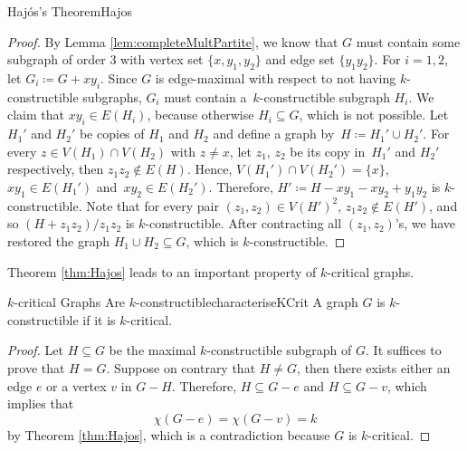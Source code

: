 \documentclass[math]{amznotes}
\theoremstyle{remark}
\begin{document}
\begin{thmbox}{Haj\'{o}s's Theorem}{Hajos}
\begin{proof}
        By Lemma \ref{lem:completeMultPartite}, we know that $G$ must contain some subgraph of order $3$ with vertex set $\{x, y_1, y_2\}$ and edge set $\{y_1y_2\}$. For $i = 1, 2$, let $G_i \coloneqq G + xy_i$. Since $G$ is edge-maximal with respect to not having $k$-constructible subgraphs, $G_i$ must contain a~$k$-constructible subgraph $H_i$. We claim that $xy_i \in E(H_i)$, because otherwise $H_i \subseteq G$, which is not possible. Let $H_1'$ and $H_2'$ be copies of $H_1$ and $H_2$ and define a graph by~$H \coloneqq H_1' \cup H_2'$. For every $z \in V(H_1) \cap V(H_2)$ with $z \neq x$, let $z_1$, $z_2$ be its copy in~$H_1'$ and $H_2'$ respectively, then $z_1z_2 \notin E(H)$. Hence, $V(H_1') \cap V(H_2') = \{x\}$, $xy_1 \in E(H_1')$ and~$xy_2 \in E(H_2')$. Therefore, $H' \coloneqq H - xy_1 - xy_2 + y_1y_2$ is $k$-constructible. Note that for every pair $(z_1, z_2) \in V(H')^2$, $z_1z_2 \notin E(H')$, and so $(H + z_1z_2)/z_1z_2$ is $k$-constructible. After contracting all $(z_1, z_2)$'s, we have restored the graph $H_1 \cup H_2 \subseteq G$, which is $k$-constructible.
    \end{proof}
\end{thmbox}
Theorem \ref{thm:Hajos} leads to an important property of $k$-critical graphs.
\begin{corbox}{$k$-critical Graphs Are $k$-constructible}{characteriseKCrit}
    A graph $G$ is $k$-constructible if it is $k$-critical. 
    \tcblower
    \begin{proof}
        Let $H \subseteq G$ be the maximal $k$-constructible subgraph of $G$. It suffices to prove that $H = G$. Suppose on contrary that $H \neq G$, then there exists either an edge $e$ or a vertex $v$ in $G - H$. Therefore, $H \subseteq G - e$ and $H \subseteq G - v$, which implies that 
        \begin{equation*}
            \chi(G - e) = \chi(G - v) = k
        \end{equation*}
        by Theorem \ref{thm:Hajos}, which is a contradiction because $G$ is $k$-critical.
    \end{proof}
\end{corbox}
\end{document}
